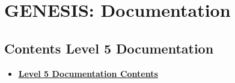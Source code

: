 \documentclass[12pt]{article}
\begin{document}
\section*{GENESIS: Documentation}

\subsection*{Contents Level 5 Documentation}

\begin{itemize}

\item \href{../contents-level5/contents-level5.pdf}{\bf \underline{Level 5 Documentation Contents}}


\end{itemize}

\end{document}
